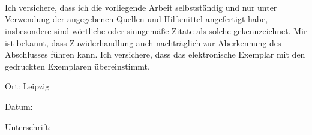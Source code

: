 \documentclass[fontsize=12, a4aper]{scrartcl}
\newcommand\textbox[1]
{
	\parbox{.333\textwidth}{#1}
}
\begin{document}
\begin{verbatim}
	
	
	
\end{verbatim}

\noindent Ich versichere, dass ich die vorliegende Arbeit selbstständig und nur unter Verwendung der
angegebenen Quellen und Hilfsmittel angefertigt habe, insbesondere sind wörtliche oder
sinngemäße Zitate als solche gekennzeichnet. Mir ist bekannt, dass Zuwiderhandlung auch
nachträglich zur Aberkennung des Abschlusses führen kann.
Ich versichere, dass das elektronische Exemplar mit den gedruckten Exemplaren übereinstimmt.

\bigskip

\noindent\textbox{Ort: Leipzig\hfill}\textbox{\hfil Datum:\hfil}\textbox{\hfill Unterschrift:}
\end{document}
